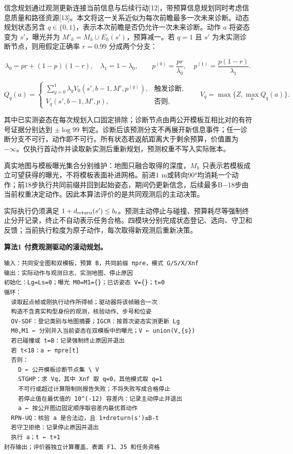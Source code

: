 \documentclass[11pt,a4paper]{article}
\begin{document}
信念规划通过观测更新连接当前信息与后续行动{[}12{]}，带预算信息规划同时考虑信息质量和路径资源{[}13{]}。本文将这一关系近似为每次前瞻最多一次未来诊断。动态规划状态另含 \(q\in\{0,1\}\)，表示本次前瞻是否仍允许一次未来诊断。动作 \(a\) 将姿态变为 \(s'\)，曝光并为 \(M'_h=M_h\cup E_h(s')\)，预算减一。若 \(q=1\) 且 \(s'\) 为未实测诊断节点，则用假定正确率 \(r=0.99\) 分成两个分支：

\[
\lambda_0=pr+(1-p)(1-r),\quad \lambda_1=1-\lambda_0,
\qquad p^{(0)}=\frac{pr}{\lambda_0},\quad
p^{(1)}=\frac{p(1-r)}{\lambda_1}.
\]

\[
Q_q(a)=
\begin{cases}
\sum_{y=0}^{1}\lambda_y V_0(s',b-1,M',p^{(y)}),&\text{触发诊断},\\
V_q(s',b-1,M',p),&\text{否则},
\end{cases}
\qquad V_q=\max\{Z,\max_a Q_q(a)\}.
\]

其中已实测姿态在每次规划入口固定排除；诊断节点由两公开模板互相比对的有符号证据分别达到 \(\pm\log99\) 判定。诊断后该预测分支不再展开新信息事件；任一诊断分支不可行，动作即不可行。所有状态若返航距离大于剩余预算，价值置为 \(-\infty\)。仅执行首动作并读取新实测后重新规划，预测权重不写入实际账本。

真实地图与模板曝光集合分别维护：地图只融合取得的深度，\(M_h\) 只表示若模板成立可望获得的曝光，不将模板表面补进网格。前进1 m或转向90°均消耗一个动作；前18步执行共同前缀并回到起始姿态，期间仍更新信念，后续最多B−18步由当前权重决定动作。因此本算法评价的是共同观测后的主动决策。

实际执行仍须满足 \(1+d_{\rm return}(s')\le b_t\)。预测主动停止与碰撞、预算耗尽等强制终止分开记录，终止不自动表示任务合格。四模块分别完成状态登记、选向、守卫和反馈；当前执行粒度为原子动作，每次取得新观测后重新决策。

\par\noindent\begin{minipage}{\linewidth}
\small
\textbf{算法1 付费观测驱动的滚动规划。}

\begin{verbatim}
输入：共同安全图和双模板，预算 B，共同前缀 πpre，模式 G/S/X/Xnf
输出：实际动作与观测日志、实测地图、停止原因
初始化：Lg=Ls=0；曝光 M0=M1={}；已访姿态 V={}；t=0
循环：
  读取起点帧或刚执行动作所得帧；驱动器将该帧融合一次
  构造不含真实构型身份的观测，核验动作、步号和位姿
  OV-SDF：登记类别与地图摘要；IGCR：按首次姿态实测更新 Lg
  M0,M1 ← 分别并入当前姿态在双模板中的曝光；V ← union(V,{s})
  若已碰撞或 t=B：记录强制终止原因并退出
  若 t<18：a ← πpre[t]
  否则：
    D ← 公开模板诊断节点集 \ V
    STGHP：求 Vq，其中 Xnf 取 q=0，其他模式取 q=1
    不可行或超过计算限制则报告失败；不将失败写成合格停止
    若停止值在最优值的 10^(-12) 容差内：记录主动停止并退出
    a ← 按公开图边固定顺序取容差内最优首动作
  RPN-UQ：核验 a 是合法边，且 1+dreturn(s')≤B-t
  若守卫拒绝：记录停止原因并退出
  执行 a；t ← t+1
封存输出；评价器独立计算覆盖、表面 F1、J5 和任务资格
\end{verbatim}
\end{minipage}
\end{document}
